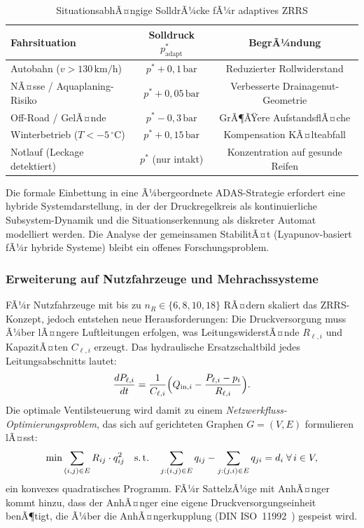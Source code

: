 ﻿\documentclass[a4paper,12pt]{article}
\theoremstyle{definition}
\begin{document}
\begin{table}[H]
\centering
\caption{SituationsabhÃ¤ngige SolldrÃ¼cke fÃ¼r adaptives ZRRS}
\label{tab:adaptive_druck}
\begin{tabular}{lcc}
\toprule
\textbf{Fahrsituation} & \textbf{Solldruck $p^*_{\text{adapt}}$} & \textbf{BegrÃ¼ndung} \\
\midrule
Autobahn ($v > 130\,\text{km/h}$) & $p^* + 0{,}1\,\text{bar}$ & Reduzierter Rollwiderstand \\
NÃ¤sse / Aquaplaning-Risiko & $p^* + 0{,}05\,\text{bar}$ & Verbesserte Drainagenut-Geometrie \\
Off-Road / GelÃ¤nde & $p^* - 0{,}3\,\text{bar}$ & GrÃ¶ÃŸere AufstandsflÃ¤che \\
Winterbetrieb ($T < -5\,^\circ\mathrm{C}$) & $p^* + 0{,}15\,\text{bar}$ & Kompensation KÃ¤lteabfall \\
Notlauf (Leckage detektiert) & $p^*$ (nur intakt) & Konzentration auf gesunde Reifen \\
\bottomrule
\end{tabular}
\end{table}

Die formale Einbettung in eine Ã¼bergeordnete ADAS-Strategie erfordert eine
hybride Systemdarstellung, in der der Druckregelkreis als kontinuierliche
Subsystem-Dynamik und die Situationserkennung als diskreter Automat modelliert
werden. Die Analyse der gemeinsamen StabilitÃ¤t (Lyapunov-basiert fÃ¼r hybride
Systeme) bleibt ein offenes Forschungsproblem.

\subsubsection{Erweiterung auf Nutzfahrzeuge und Mehrachssysteme}

FÃ¼r Nutzfahrzeuge mit bis zu $n_R \in \{6, 8, 10, 18\}$ RÃ¤dern skaliert
das ZRRS-Konzept, jedoch entstehen neue Herausforderungen: Die Druckversorgung
muss Ã¼ber lÃ¤ngere Luftleitungen erfolgen, was LeitungswiderstÃ¤nde
$R_{\ell,i}$ und KapazitÃ¤ten $C_{\ell,i}$ erzeugt. Das hydraulische
Ersatzschaltbild jedes Leitungsabschnitts lautet:
\[
    \frac{d P_{\ell,i}}{dt} = \frac{1}{C_{\ell,i}}\Bigl(Q_{\text{in},i}
    - \frac{P_{\ell,i} - p_i}{R_{\ell,i}}\Bigr).
\]
Die optimale Ventilsteuerung wird damit zu einem
\emph{Netzwerkfluss-Optimierungsproblem}, das sich auf gerichteten Graphen
$G = (V, E)$ formulieren lÃ¤sst:
\[
    \min \sum_{(i,j)\in E} R_{ij} \cdot q_{ij}^2
    \quad \text{s.\,t.} \quad
    \sum_{j: (i,j)\in E} q_{ij} - \sum_{j:(j,i)\in E} q_{ji} = d_i
    \;\forall\, i \in V,
\]
ein konvexes quadratisches Programm. FÃ¼r SattelzÃ¼ge mit AnhÃ¤nger kommt
hinzu, dass der AnhÃ¤nger eine eigene Druckversorgungseinheit benÃ¶tigt, die
Ã¼ber die AnhÃ¤ngerkupplung (DIN ISO~11992~\cite{iso11992}) gespeist wird.
\end{document}
